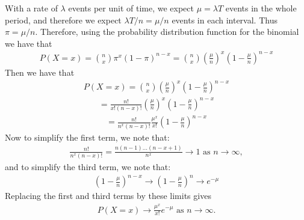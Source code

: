 \documentclass[letterpaper,10pt,english]{jupyterBook}
\begin{document}
\sphinxAtStartPar
With a rate of \(\lambda\) events per unit of time, we expect \(\mu=\lambda T\) events in the whole period, and therefore we expect \(\lambda T / n = \mu/n\) events in each interval. Thus \(\pi=\mu/n\). Therefore, using the probability distribution function for the binomial we have that
\begin{equation*}
\begin{split}
P(X=x) = {n \choose x} \pi^{x} (1-\pi)^{n-x} = {n \choose x} \left(\frac{\mu}{n}\right)^{x} \left(1-\frac{\mu}{n}\right)^{n-x}
\end{split}
\end{equation*}
\sphinxAtStartPar
Then we have that
\begin{equation*}
\begin{split}
P(X=x) = {n \choose x} \left(\frac{\mu}{n}\right)^{x} \left(1-\frac{\mu}{n}\right)^{n-x} 
\end{split}
\end{equation*}\begin{equation*}
\begin{split}
= \frac{n!}{x! (n-x)!} \left(\frac{\mu}{n}\right)^{x} \left(1-\frac{\mu}{n}\right)^{n-x}
\end{split}
\end{equation*}\begin{equation*}
\begin{split}
= \frac{n!}{n^{x} (n-x)!}  \frac{\mu^{x}}{x!} \left(1-\frac{\mu}{n}\right)^{n-x}
\end{split}
\end{equation*}
\sphinxAtStartPar
Now to simplify the first term, we note that:
\begin{equation*}
\begin{split}
\frac{n!}{n^{x} (n-x)!} = \frac{n(n-1)...(n-x+1)}{n^{x}} \rightarrow 1 \mbox{ as } n \rightarrow \infty,
\end{split}
\end{equation*}
\sphinxAtStartPar
and to simplify the third term, we note that:
\begin{equation*}
\begin{split}
\left(1-\frac{\mu}{n}\right)^{n-x} \rightarrow \left(1-\frac{\mu}{n}\right)^{n} \rightarrow e^{-\mu}
\end{split}
\end{equation*}
\sphinxAtStartPar
Replacing the first and third terms by these limits gives
\begin{equation*}
\begin{split}
P(X=x) \rightarrow \frac{\mu^{x}}{x!} e^{-\mu} \mbox{ as } n \rightarrow \infty.
\end{split}
\end{equation*}
\end{document}
